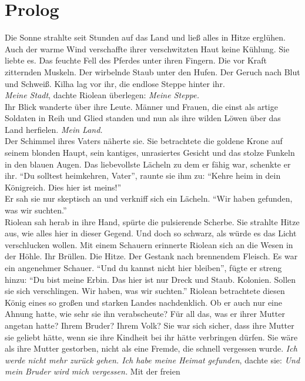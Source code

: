 \chapter{Prolog}

Die Sonne strahlte seit Stunden auf das Land und ließ alles in Hitze erglühen. Auch der warme Wind 
verschaffte ihrer verschwitzten Haut keine Kühlung. Sie liebte es. Das feuchte Fell des Pferdes 
unter ihren Fingern. Die vor Kraft zitternden Muskeln. Der wirbelnde Staub unter den Hufen. Der 
Geruch nach Blut und Schweiß. Kilha lag vor ihr, die endlose Steppe hinter ihr.\\
\textit{Meine Stadt}, dachte Riolean überlegen: \textit{Meine Steppe.}\\
Ihr Blick wanderte über ihre Leute. Männer und Frauen, die einst als artige Soldaten in Reih und 
Glied standen und nun als ihre wilden Löwen über das Land herfielen. \textit{Mein Land.}\\
Der Schimmel ihres Vaters näherte sie. Sie betrachtete die goldene Krone auf seinem blonden Haupt, 
sein kantiges, unrasiertes Gesicht und das stolze Funkeln in den blauen Augen. Das liebevollste 
Lächeln zu dem er fähig war, schenkte er ihr. ``Du solltest heimkehren, Vater'', raunte sie ihm zu: 
``Kehre heim in dein Königreich. Dies hier ist meins!''\\
Er sah sie nur skeptisch an und verkniff sich ein Lächeln. ``Wir haben gefunden, was wir 
suchten.''\\
Riolean sah herab in ihre Hand, spürte die pulsierende Scherbe. Sie strahlte Hitze aus, wie alles 
hier in dieser Gegend. Und doch so schwarz, als würde es das Licht verschlucken wollen. Mit einem 
Schauern erinnerte Riolean sich an die Wesen in der Höhle. Ihr Brüllen. Die Hitze. Der Gestank nach 
brennendem Fleisch. Es war ein angenehmer Schauer. ``Und du kannst nicht hier bleiben'', fügte er 
streng hinzu: ``Du bist meine Erbin. Das hier ist nur Dreck und Staub. Kolonien. Sollen sie sich 
verschlingen. Wir haben, was wir suchten.''
Riolean betrachtete diesen König eines so großen und starken Landes nachdenklich. Ob er auch nur 
eine Ahnung hatte, wie sehr sie ihn verabscheute? Für all das, was er ihrer Mutter angetan 
hatte? Ihrem Bruder? Ihrem Volk? Sie war sich sicher, dass ihre Mutter sie geliebt hätte, wenn 
sie ihre Kindheit bei ihr hätte verbringen dürfen. Sie wäre als ihre Mutter gestorben, nicht als 
eine Fremde, die schnell vergessen wurde. \textit{Ich werde nicht mehr zurück gehen. Ich habe 
meine Heimat gefunden}, dachte sie: \textit{Und mein Bruder wird mich vergessen.} Mit der freien 
